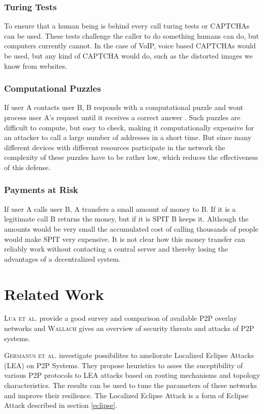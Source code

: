 \documentclass[a4paper,conference]{IEEEtran}
\begin{document}
\subsubsection{Turing Tests}
To ensure that a human being is behind every call turing tests or CAPTCHAs can
be used. These tests challenge the caller to do something
humans can do, but computers currently cannot. In the case of VoIP, voice based
CAPTCHAs would be used, but any kind
of CAPTCHA would do, such as the distorted images we know from websites.

\subsubsection{Computational Puzzles}
If user A contacts user B, B responds with a computational puzzle and wont
process user A's request until it receives a correct answer \cite{touceda}. Such
puzzles
are difficult to compute, but easy to check, making it computationally expensive
for an attacker to call a large number of addresses in a short time.
But since many different devices with different resources participate in the
network the complexity of these puzzles have to be rather low, which
reduces the effectiveness of this defense.

\subsubsection{Payments at Risk}
If user A calls user B, A transfers a small amount of money to B. If it is a
legitimate call B returns the money, but if it is SPIT B keeps it. Although
the amounts would be very small the accumulated cost of calling thousands of
people would make SPIT very expensive. It is not clear how this money transfer
can reliably work without contacting a central server and thereby losing the
advantages of a decentralized system.


\section{Related Work}
\label{relatedwork}

\textsc{Lua et al.} \cite{lua} provide a good survey and comparison of available
P2P overlay networks and \textsc{Wallach} \cite{wallach} gives an overview of
security threats
and attacks of P2P systems.

\textsc{Germanus et al.} \cite{germanus} investigate possibilites to ameliorate Localized Eclipse Attacks (LEA) on P2P Systems. They propose heuristics to
asses the suceptibility of various P2P protocols to LEA attacks based on routing mechanisms and topology characteristics. The results can be used to tune the
parameters of these networks and improve their resilience. The Localized Eclipse Attack is a form of Eclipse Attack described in section \ref{eclipse}.
\end{document}
